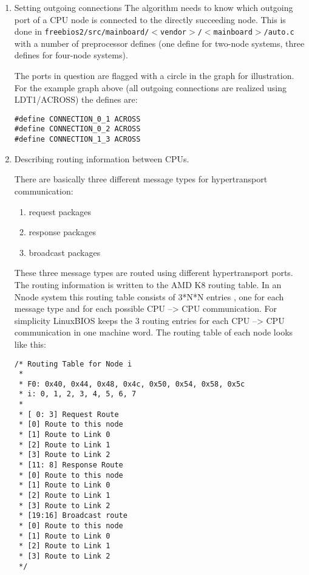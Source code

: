 \documentclass[titlepage,12pt]{article}
\begin{document}
\begin{enumerate}
\item Setting outgoing connections
The algorithm needs to know which outgoing port of a CPU node is
connected to the directly succeeding node. This is done in
\texttt{freebios2/src/mainboard/$<$vendor$>$/$<$mainboard$>$/auto.c}
with a number of preprocessor defines (one define for two-node systems,
three defines for four-node systems).

The ports in question are flagged with a circle in the graph for
illustration. For the example graph above (all outgoing connections are
realized using LDT1/ACROSS) the defines are:

\begin{verbatim}
#define CONNECTION_0_1 ACROSS
#define CONNECTION_0_2 ACROSS
#define CONNECTION_1_3 ACROSS
\end{verbatim}

\item Describing routing information between CPUs.

There are basically three different message types for hypertransport
communication:
\begin{enumerate}
\item request packages
\item response packages
\item broadcast packages
\end{enumerate}

These three message types are routed using different hypertransport
ports. The routing information is written to the AMD K8 routing table.
In an Nnode system this routing table consists of 3*N*N entries , one
for each message type and for each possible CPU --> CPU communication. For
simplicity LinuxBIOS keeps the 3 routing entries for each CPU --> CPU
communication in one machine word.  The routing table of each node looks
like this:

\begin{verbatim}
/* Routing Table for Node i
 *
 * F0: 0x40, 0x44, 0x48, 0x4c, 0x50, 0x54, 0x58, 0x5c
 * i: 0, 1, 2, 3, 4, 5, 6, 7
 *
 * [ 0: 3] Request Route
 * [0] Route to this node
 * [1] Route to Link 0
 * [2] Route to Link 1
 * [3] Route to Link 2
 * [11: 8] Response Route
 * [0] Route to this node
 * [1] Route to Link 0
 * [2] Route to Link 1
 * [3] Route to Link 2
 * [19:16] Broadcast route
 * [0] Route to this node
 * [1] Route to Link 0
 * [2] Route to Link 1
 * [3] Route to Link 2
 */
\end{verbatim}


\end{enumerate}
\end{document}
